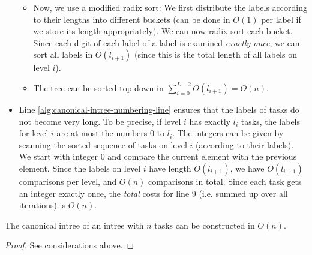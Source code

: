 \begin{itemize}
\begin{itemize}
  \item Now, we use a modified radix sort: We first distribute the labels according to their lengths into different buckets (can be done in $O(1)$ per label if we store its length appropriately).
    We can now radix-sort each bucket. Since each digit of each label of a label is examined \emph{exactly once}, we can sort all labels in $O(l_{i+1})$ (since this is the total length of all labels on level $i$).
  \item The tree can be sorted top-down in $\sum_{i=0}^{L-2}O(l_{i+1})=O(n)$.
  \end{itemize}
\item Line \ref{alg:canonical-intree-numbering-line} ensures that the labels of tasks do not become very long. To be precise, if level $i$ has exactly $l_i$ tasks, the labels for level $i$ are at most the numbers 0 to $l_i$. The integers can be given by scanning the sorted sequence of tasks on level $i$ (according to their labels). We start with integer 0 and compare the current element with the previous element. Since the labels on level $i$ have length $O(l_{i+1})$, we have $O(l_{i+1})$ comparisons per level, and $O(n)$ comparisons in total.
Since each task gets an integer exactly once, the \emph{total} costs for line 9 (i.e. summed up over all iterations) is $O(n)$.
\end{itemize}

\begin{theorem}
  The canonical intree of an intree with $n$ tasks can be constructed in $O(n)$.
\end{theorem}

\begin{proof}
  See considerations above.
\end{proof}


